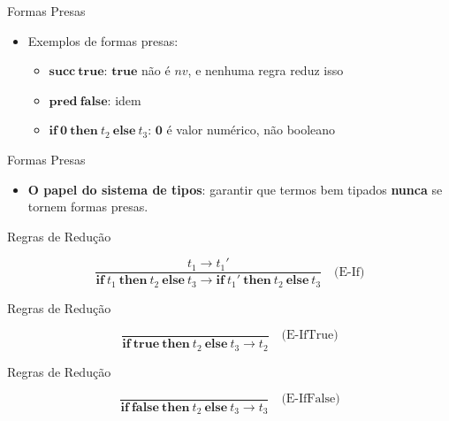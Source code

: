 \begin{frame}{Formas Presas}

    \begin{itemize}
        \item
        Exemplos de formas presas:

        \begin{itemize}

            \item
            \(\mathbf{succ}\ \mathbf{true}\): \(\mathbf{true}\) não é \(nv\), e
            nenhuma regra reduz isso
            \item
            \(\mathbf{pred}\ \mathbf{false}\): idem
            \item
            \(\mathbf{if}\ \mathbf{0}\ \mathbf{then}\ t_2\ \mathbf{else}\ t_3\):
            \(\mathbf{0}\) é valor numérico, não booleano
        \end{itemize}
    \end{itemize}
\end{frame}

\begin{frame}{Formas Presas}

    \begin{itemize}

        \item
        \textbf{O papel do sistema de tipos}: garantir que termos bem tipados
        \textbf{nunca} se tornem formas presas.
    \end{itemize}
\end{frame}

\begin{frame}{Regras de Redução}

    \[\frac{t_1 \to t_1'}{\mathbf{if}\ t_1\ \mathbf{then}\ t_2\ \mathbf{else}\ t_3 \to \mathbf{if}\ t_1'\ \mathbf{then}\ t_2\ \mathbf{else}\ t_3}
    \quad\text{(E-If)}\]
\end{frame}

\begin{frame}{Regras de Redução}

    \[\frac{}{\mathbf{if}\ \mathbf{true}\ \mathbf{then}\ t_2\ \mathbf{else}\ t_3 \to t_2}
    \quad\text{(E-IfTrue)}\]
\end{frame}

\begin{frame}{Regras de Redução}

    \[\frac{}{\mathbf{if}\ \mathbf{false}\ \mathbf{then}\ t_2\ \mathbf{else}\ t_3 \to t_3}
    \quad\text{(E-IfFalse)}\]
\end{frame}

